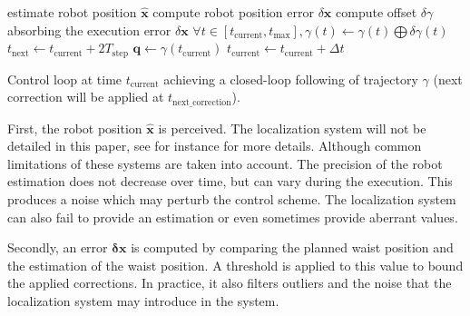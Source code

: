 \begin{algorithm}
  \begin{algorithmic}
    \STATE estimate robot position $\mathbf{\hat{x}}$
    \STATE compute robot position error $\delta \mathbf{x}$
    \STATE compute offset $\delta \gamma$ absorbing the execution
    error $\delta \mathbf{x}$
    \STATE $\forall t \in [t_{\text{current}}, t_{\text{max}}],
    \gamma(t) \leftarrow \gamma(t) \bigoplus \delta \gamma(t)$
    \STATE $t_{\text{next}} \leftarrow t_{\text{current}} + 2 T_{\text{step}}$
    \ENDIF
    \ENDIF
    \STATE $\mathbf{q} \leftarrow \gamma(t_{\text{current}})$
    \STATE $t_{\text{current}} \leftarrow t_{\text{current}} + \Delta t$
  \end{algorithmic}
  \caption{Control loop at time $t_{\text{current}}$ achieving a
    closed-loop following of trajectory $\gamma$ (next correction will
    be applied at
    $t_{\text{next\_correction}}$). \label{fig:control_loop}}
\end{algorithm}


First, the robot position $\hat{\mathbf{x}}$ is perceived. The localization
system will not be detailed in this paper, see \cite{06humanoids.thompson,
  05humanoids.thompson} for instance for more details. Although common
limitations of these systems are taken into account. The precision of
the robot estimation does not decrease over time, but can vary during
the execution. This produces a noise which may perturb the
control scheme. The localization system can also fail to provide an
estimation or even sometimes provide aberrant values.

Secondly, an error $\mathbf{\delta \mathbf{x}}$ is computed by comparing the
planned waist position and the estimation of the waist position. A
threshold is applied to this value to bound the applied
corrections. In practice, it also filters outliers and the noise
that the localization system may introduce in the system.


